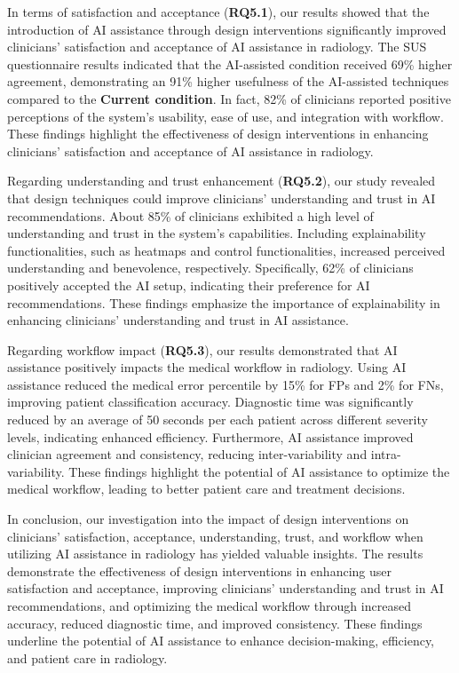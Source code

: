 In terms of satisfaction and acceptance ({\bf RQ5.1}), our results showed that the introduction of \ac{AI} assistance through design interventions significantly improved clinicians' satisfaction and acceptance of \ac{AI} assistance in radiology.
The \ac{SUS} questionnaire results indicated that the \ac{AI}-assisted condition received 69\% higher agreement, demonstrating an 91\% higher usefulness of the \ac{AI}-assisted techniques compared to the {\bf Current condition}.
In fact, 82\% of clinicians reported positive perceptions of the system's usability, ease of use, and integration with workflow.
These findings highlight the effectiveness of design interventions in enhancing clinicians' satisfaction and acceptance of \ac{AI} assistance in radiology.

Regarding understanding and trust enhancement ({\bf RQ5.2}), our study revealed that design techniques could improve clinicians' understanding and trust in \ac{AI} recommendations.
About 85\% of clinicians exhibited a high level of understanding and trust in the system's capabilities.
Including explainability functionalities, such as heatmaps and control functionalities, increased perceived understanding and benevolence, respectively.
Specifically, 62\% of clinicians positively accepted the \ac{AI} setup, indicating their preference for \ac{AI} recommendations.
These findings emphasize the importance of explainability in enhancing clinicians' understanding and trust in \ac{AI} assistance.

Regarding workflow impact ({\bf RQ5.3}), our results demonstrated that \ac{AI} assistance positively impacts the medical workflow in radiology.
Using \ac{AI} assistance reduced the medical error percentile by 15\% for \acp{FP} and 2\% for \acp{FN}, improving patient classification accuracy.
Diagnostic time was significantly reduced by an average of 50 seconds per each patient across different severity levels, indicating enhanced efficiency.
Furthermore, \ac{AI} assistance improved clinician agreement and consistency, reducing inter-variability and intra-variability.
These findings highlight the potential of \ac{AI} assistance to optimize the medical workflow, leading to better patient care and treatment decisions.

In conclusion, our investigation into the impact of design interventions on clinicians' satisfaction, acceptance, understanding, trust, and workflow when utilizing \ac{AI} assistance in radiology has yielded valuable insights.
The results demonstrate the effectiveness of design interventions in enhancing user satisfaction and acceptance, improving clinicians' understanding and trust in \ac{AI} recommendations, and optimizing the medical workflow through increased accuracy, reduced diagnostic time, and improved consistency.
These findings underline the potential of \ac{AI} assistance to enhance decision-making, efficiency, and patient care in radiology.

